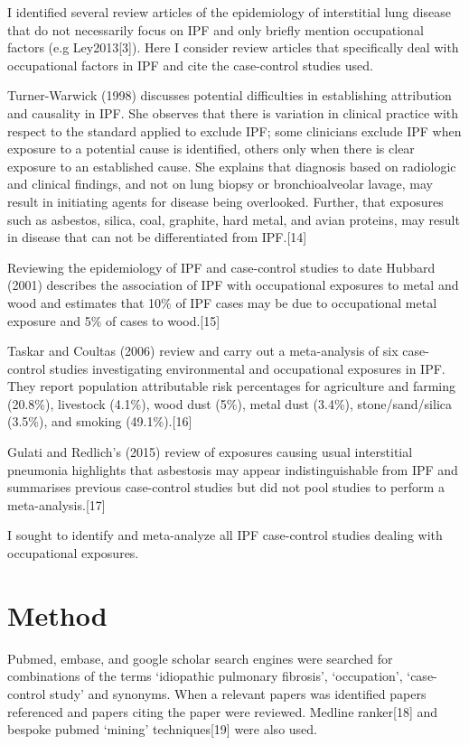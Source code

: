 \documentclass[12pt,a4paper,]{report}
\begin{document}
I identified several review articles of the epidemiology of interstitial
lung disease that do not necessarily focus on IPF and only briefly
mention occupational factors (e.g Ley2013{[}3{]}). Here I consider
review articles that specifically deal with occupational factors in IPF
and cite the case-control studies used.

Turner-Warwick (1998) discusses potential difficulties in establishing
attribution and causality in IPF. She observes that there is variation
in clinical practice with respect to the standard applied to exclude
IPF; some clinicians exclude IPF when exposure to a potential cause is
identified, others only when there is clear exposure to an established
cause. She explains that diagnosis based on radiologic and clinical
findings, and not on lung biopsy or bronchioalveolar lavage, may result
in initiating agents for disease being overlooked. Further, that
exposures such as asbestos, silica, coal, graphite, hard metal, and
avian proteins, may result in disease that can not be differentiated
from IPF.{[}14{]}

Reviewing the epidemiology of IPF and case-control studies to date
Hubbard (2001) describes the association of IPF with occupational
exposures to metal and wood and estimates that 10\% of IPF cases may be
due to occupational metal exposure and 5\% of cases to wood.{[}15{]}

Taskar and Coultas (2006) review and carry out a meta-analysis of six
case-control studies investigating environmental and occupational
exposures in IPF. They report population attributable risk percentages
for agriculture and farming (20.8\%), livestock (4.1\%), wood dust
(5\%), metal dust (3.4\%), stone/sand/silica (3.5\%), and smoking
(49.1\%).{[}16{]}

Gulati and Redlich's (2015) review of exposures causing usual
interstitial pneumonia highlights that asbestosis may appear
indistinguishable from IPF and summarises previous case-control studies
but did not pool studies to perform a meta-analysis.{[}17{]}

I sought to identify and meta-analyze all IPF case-control studies
dealing with occupational exposures.

\hypertarget{method}{%
\section{Method}\label{method}}

Pubmed, embase, and google scholar search engines were searched for
combinations of the terms `idiopathic pulmonary fibrosis', `occupation',
`case-control study' and synonyms. When a relevant papers was identified
papers referenced and papers citing the paper were reviewed. Medline
ranker{[}18{]} and bespoke pubmed `mining' techniques{[}19{]} were also
used.
\end{document}
